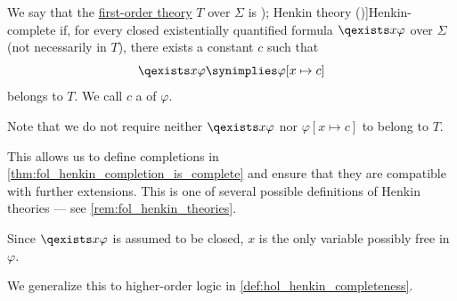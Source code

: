 \begin{definition}\label{def:fol_henkin_completeness}
  We say that the \hyperref[def:fol_theory]{first-order theory} \( T \) over \( \Sigma \) is \term[en=Henkin-complete (theory) (\cite[def. 3.1.7]{Hinman2005Logic}); Henkin theory (\cite[def. 3.1.4(iii)]{VanDalen2004LogicAndStructure})]{Henkin-complete} if, for every closed existentially quantified formula \( \qexists x \varphi \) over \( \Sigma \) (not necessarily in \( T \)), there exists a constant \( c \) such that
  \begin{equation}\label{eq:def:fol_henkin_completeness/axiom}
    \qexists x \varphi \synimplies \varphi[x \mapsto c]
  \end{equation}
  belongs to \( T \). We call \( c \) a  of \( \varphi \).
\end{definition}
\begin{comments}
  \item Note that we do not require neither \( \qexists x \varphi \) nor \( \varphi[x \mapsto c] \) to belong to \( T \).

  This allows us to define completions in \cref{thm:fol_henkin_completion_is_complete} and ensure that they are compatible with further extensions. This is one of several possible definitions of Henkin theories --- see \cref{rem:fol_henkin_theories}.

  \item Since \( \qexists x \varphi \) is assumed to be closed, \( x \) is the only variable possibly free in \( \varphi \).

  \item We generalize this to higher-order logic in \cref{def:hol_henkin_completeness}.
\end{comments}

